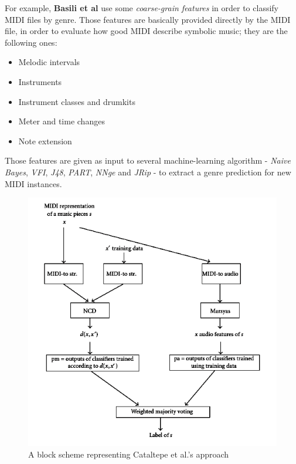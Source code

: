 \documentclass[a4paper]{article}
\begin{document}
	For example, \textbf{Basili et al} \cite{torver} use some \textit{coarse-grain features} in order to classify MIDI files by genre. Those features are basically provided directly by the MIDI file, in order to evaluate how good MIDI describe symbolic music; they are the following ones:
	\begin{itemize}
		\item Melodic intervals
		\item Instruments
		\item Instrument classes and drumkits
		\item Meter and time changes
		\item Note extension
	\end{itemize}
	Those features are given as input to several machine-learning algorithm - \textit{Naive Bayes}, \textit{VFI}, \textit{J48}, \textit{PART}, \textit{NNge} and \textit{JRip} - to extract a genre prediction for new MIDI instances.
	
	\begin{figure}[!h]
		\centering
		\label{fig:audio_and_NCD}
		\includegraphics[scale=0.5]{misc/audio_and_ncd.png}
		\caption{A block scheme representing Cataltepe et al.'s approach}
	\end{figure}
	
\end{document}
